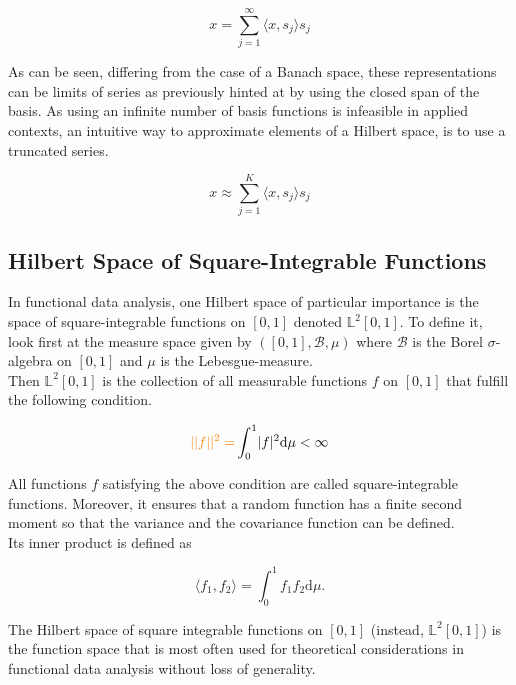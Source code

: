 \documentclass[11pt,twoside,a4paper]{article}
\begin{document}
	\begin{equation}
		x = \sum_{j = 1}^{\infty}{\langle x, s_j \rangle}s_j
	\end{equation}
	
	As can be seen, differing from the case of a Banach space, these representations can be limits of series as previously hinted at by using the closed span of the basis. As using an infinite number of basis functions is infeasible in applied contexts, an intuitive way to approximate elements of a Hilbert space, is to use a truncated series.
	
	\begin{equation}
		x \approx \sum_{j = 1}^{K}{\langle x, s_j \rangle}s_j
	\end{equation}
	
	\subsection{Hilbert Space of Square-Integrable Functions}
	In functional data analysis, one Hilbert space of particular importance is the space of square-integrable functions on $[0,1]$ denoted $\mathbb{L}^2[0,1]$. To define it, look first at the measure space given by $([0,1], \mathcal{B}, \mu)$ where $\mathcal{B}$ is the Borel $\sigma$-algebra on $[0,1]$ and $\mu$ is the Lebesgue-measure.\\
	Then $\mathbb{L}^2[0,1]$ is the collection of all measurable functions $f$ on $[0,1]$ that fulfill the following condition.
	
	\begin{equation}
		{\color{orange} \lvert \lvert f \rvert \rvert^2 =} \int_{0}^{1} \lvert f \rvert^2 \mathrm{d}\mu < \infty
	\end{equation}
	
	All functions $f$ satisfying the above condition are called square-integrable functions. Moreover, it ensures that a random function has a finite second moment so that the variance and the covariance function can be defined.\\
	Its inner product is defined as
	
	\begin{equation}
		\langle f_1, f_2 \rangle = \int_{0}^{1} f_1 f_2 \mathrm{d}\mu.
	\end{equation}
	
	The Hilbert space of square integrable functions on $[0,1]$ {\color{orange} (instead, $\mathbb{L}^2[0,1]$)} is the function space that is most often used for theoretical considerations in functional data analysis  {\color{orange} without loss of generality}. 
	
\end{document}
